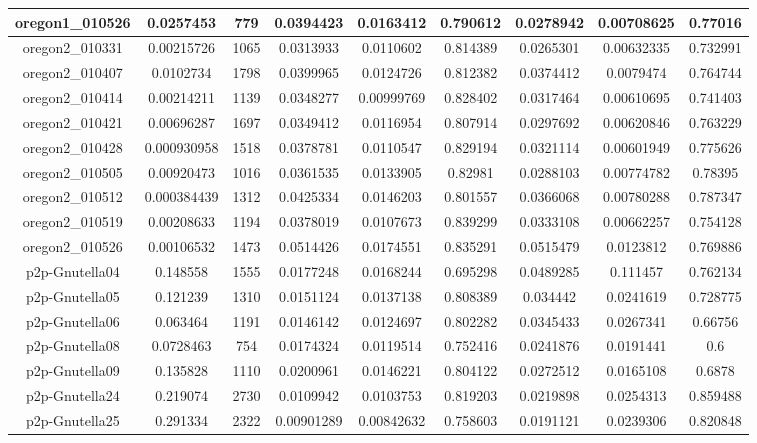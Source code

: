 \documentclass[10]{report}
\begin{document}
\begin{table}
{\begin{tabular}{|c|c|c|c|c|c|c|c|c|}
\hline
oregon1\_010526&0.0257453 & 779 & 0.0394423 & 0.0163412 & 0.790612 & 0.0278942 & 0.00708625 & 0.77016 \\
\hline
oregon2\_010331&0.00215726 & 1065 & 0.0313933 & 0.0110602 & 0.814389 & 0.0265301 & 0.00632335 & 0.732991 \\
\hline
oregon2\_010407&0.0102734 & 1798 & 0.0399965 & 0.0124726 & 0.812382 & 0.0374412 & 0.0079474 & 0.764744 \\
\hline
oregon2\_010414&0.00214211 & 1139 & 0.0348277 & 0.00999769 & 0.828402 & 0.0317464 & 0.00610695 & 0.741403 \\
\hline
oregon2\_010421&0.00696287 & 1697 & 0.0349412 & 0.0116954 & 0.807914 & 0.0297692 & 0.00620846 & 0.763229 \\
\hline
oregon2\_010428&0.000930958 & 1518 & 0.0378781 & 0.0110547 & 0.829194 & 0.0321114 & 0.00601949 & 0.775626 \\
\hline
oregon2\_010505&0.00920473 & 1016 & 0.0361535 & 0.0133905 & 0.82981 & 0.0288103 & 0.00774782 & 0.78395 \\
\hline
oregon2\_010512&0.000384439 & 1312 & 0.0425334 & 0.0146203 & 0.801557 & 0.0366068 & 0.00780288 & 0.787347 \\
\hline
oregon2\_010519&0.00208633 & 1194 & 0.0378019 & 0.0107673 & 0.839299 & 0.0333108 & 0.00662257 & 0.754128 \\
\hline
oregon2\_010526&0.00106532 & 1473 & 0.0514426 & 0.0174551 & 0.835291 & 0.0515479 & 0.0123812 & 0.769886 \\
\hline
p2p-Gnutella04&0.148558 & 1555 & 0.0177248 & 0.0168244 & 0.695298 & 0.0489285 & 0.111457 & 0.762134 \\
\hline
p2p-Gnutella05&0.121239 & 1310 & 0.0151124 & 0.0137138 & 0.808389 & 0.034442 & 0.0241619 & 0.728775 \\
\hline
p2p-Gnutella06&0.063464 & 1191 & 0.0146142 & 0.0124697 & 0.802282 & 0.0345433 & 0.0267341 & 0.66756 \\
\hline
p2p-Gnutella08&0.0728463 & 754 & 0.0174324 & 0.0119514 & 0.752416 & 0.0241876 & 0.0191441 & 0.6 \\
\hline
p2p-Gnutella09&0.135828 & 1110 & 0.0200961 & 0.0146221 & 0.804122 & 0.0272512 & 0.0165108 & 0.6878 \\
\hline
p2p-Gnutella24&0.219074 & 2730 & 0.0109942 & 0.0103753 & 0.819203 & 0.0219898 & 0.0254313 & 0.859488 \\
\hline
p2p-Gnutella25&0.291334 & 2322 & 0.00901289 & 0.00842632 & 0.758603 & 0.0191121 & 0.0239306 & 0.820848 \\
\hline

\end{tabular}}
\end{table}
\end{document}
